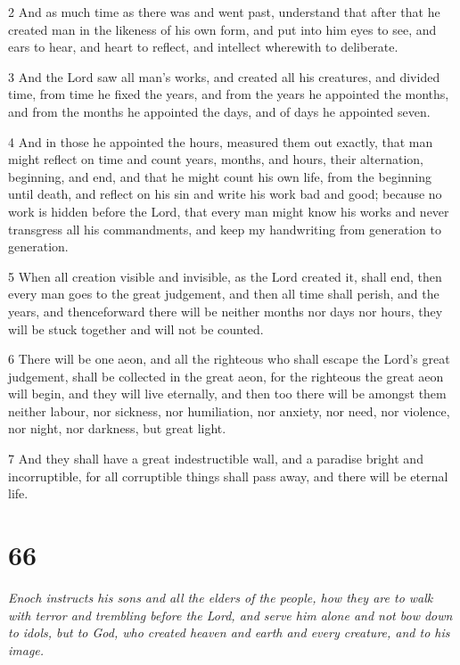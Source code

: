\par 2 And as much time as there was and went past, understand that after that he created man in the likeness of his own form, and put into him eyes to see, and ears to hear, and heart to reflect, and intellect wherewith to deliberate.

\par 3 And the Lord saw all man's works, and created all his creatures, and divided time, from time he fixed the years, and from the years he appointed the months, and from the months he appointed the days, and of days he appointed seven.

\par 4 And in those he appointed the hours, measured them out exactly, that man might reflect on time and count years, months, and hours, their alternation, beginning, and end, and that he might count his own life, from the beginning until death, and reflect on his sin and write his work bad and good; because no work is hidden before the Lord, that every man might know his works and never transgress all his commandments, and keep my handwriting from generation to generation.

\par 5 When all creation visible and invisible, as the Lord created it, shall end, then every man goes to the great judgement, and then all time shall perish, and the years, and thenceforward there will be neither months nor days nor hours, they will be stuck together and will not be counted.

\par 6 There will be one aeon, and all the righteous who shall escape the Lord's great judgement, shall be collected in the great aeon, for the righteous the great aeon will begin, and they will live eternally, and then too there will be amongst them neither labour, nor sickness, nor humiliation, nor anxiety, nor need, nor violence, nor night, nor darkness, but great light.

\par 7 And they shall have a great indestructible wall, and a paradise bright and incorruptible, for all corruptible things shall pass away, and there will be eternal life.

\chapter{66}

\par \textit{Enoch instructs his sons and all the elders of the people, how they are to walk with terror and trembling before the Lord, and serve him alone and not bow down to idols, but to God, who created heaven and earth and every creature, and to his image.}


